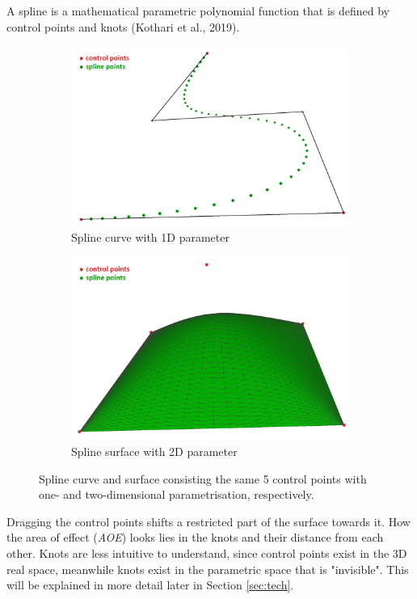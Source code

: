 \documentclass{article}
\begin{document}
A spline is a mathematical parametric polynomial function that is defined by control points and knots (Kothari et al., 2019).

\begin{figure}[H]
\centering
\begin{subfigure}[b]{0.48\textwidth}
\includegraphics[width=\textwidth]{splinecurve}
\caption{Spline curve with 1D parameter}
\label{splinecurve}
\end{subfigure}
\begin{subfigure}[b]{0.48\textwidth}
\includegraphics[width=\textwidth]{splinesurface}
\caption{Spline surface with 2D parameter}
\label{splinesurface}
\end{subfigure}
\caption{Spline curve and surface consisting the same 5 control points with one- and two-dimensional parametrisation, respectively.}
\end{figure}

Dragging the control points shifts a restricted part of the surface towards it. How the area of effect (\emph{AOE}) looks lies in the knots and their distance from each other. Knots are less intuitive to understand, since control points exist in the 3D real space, meanwhile knots exist in the parametric space that is "invisible". This will be explained in more detail later in Section \ref{sec:tech}.
\end{document}
